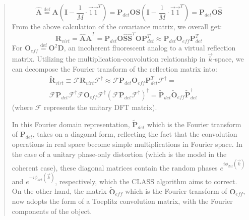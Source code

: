 \documentclass[12pt]{article}
\newenvironment{ourresponse}
    {\begin{tcolorbox}[width=\linewidth,breakable,enhanced,colback=gray!5,colframe=responsecolor!50,title=Response,left=5pt,right=5pt]}
    {\end{tcolorbox}}
\begin{document}
\begin{enumerate}[label=\arabic*.]
\begin{ourresponse}
\begin{quote}
            \begin{equation}
            \hat{\textbf{A}}\stackrel{\text{def}} = {\textbf{A}}(\mathbf{I}-\frac{1}{M}\cdot\vec{1}\vec{1}^T) = {\textbf{P}_{det}}{\textbf{O}}{\textbf{S}}(\mathbf{I}-\frac{1}{M}\cdot\vec{1}\vec{1}^T)
             = {\textbf{P}_{det}}{\textbf{O}}\hat{\textbf{S}}
             \label{eq:3}
            \tag{S3}
            \end{equation}
            From the above calculation of the covariance matrix, we overall get:
            \begin{equation}
            \textbf{R}_{virt}=\hat{\textbf{A}}\hat{\textbf{A}}^T = {\textbf{P}_{det}}\textbf{O}\hat{\textbf{S}}\hat{\textbf{S}}^T\textbf{O}\textbf{P}_{det}^T \approx \textbf{P}_{det}{\textbf{O}_{eff}} \textbf{P}_{det}^T
            \tag{S4}
            \label{eq:4}
            \end{equation}
            For $\textbf{O}_{eff}\stackrel{\text{def}}=\textbf{O}^2 \textbf{D}$, an incoherent fluorescent analog to a virtual reflection matrix.
            Utilizing the multiplication-convolution relationship in $\vec{k}$-space, we can decompose the Fourier transform of the reflection matrix into: 
            \begin{align}
            \tag{S5}
            \label{eq:5}
            \tilde{\textbf{R}}_{virt}\equiv\mathcal{F}\textbf{R}_{virt}\mathcal{F}^{\dagger} \approx  \mathcal{F}\textbf{P}_{det}{\textbf{O}_{eff}} \textbf{P}_{det}^T\mathcal{F}^{\dagger} = &&  \\ \nonumber 
            \mathcal{F}\textbf{P}_{det}\mathcal{F}^{\dagger}\mathcal{F}\textbf{O}_{eff}\mathcal{F}^{\dagger}(\mathcal{F}\textbf{P}_{det}\mathcal{F}^{\dagger})^{\dagger}={\tilde{\textbf{P}}_{det}}{\tilde{\textbf{O}}_{eff}}{\tilde{\textbf{P}}^{\dagger}_{det}}
            \end{align}
            (where $\mathcal{F}$ represents the unitary DFT matrix).
            
            
            In this Fourier domain representation, $\tilde{\textbf{P}}_{det}$ which is the Fourier transform of $\textbf{P}_{det}$, takes on a diagonal form, reflecting the fact that the convolution operations in real space become simple multiplications in Fourier space. In the case of a unitary phase-only distortion (which is the model in the coherent case), these diagonal matrices contain the random phases $e^{i\phi_{det}(\vec{k})}$ and $e^{-i\phi_{det}(\vec{k})}$, respectively, which the CLASS algorithm aims to correct. On the other hand, the matrix $\tilde{\textbf{O}}_{eff}$ which is the Fourier transform of $\textbf{O}_{eff}$, now adopts the form of a Toeplitz convolution matrix, with the Fourier components of the object.
            

\end{quote}
\end{ourresponse}
\end{enumerate}
\end{document}
